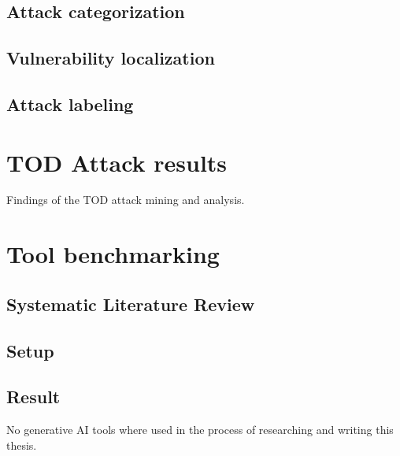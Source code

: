 \documentclass[draft,final]{vutinfth} %
\begin{document}
\section{Attack categorization}

\section{Vulnerability localization}

\section{Attack labeling}

\chapter{TOD Attack results}

Findings of the TOD attack mining and analysis.

\chapter{Tool benchmarking}

\section{Systematic Literature Review}

\section{Setup}

\section{Result}




\backmatter

\begin{aitools}
    No generative AI tools where used in the process of researching and writing this thesis.
\end{aitools}

\listoffigures %

\cleardoublepage %
\listoftables %

\listofalgorithms
{}

\printindex

\printglossaries



\end{document}
